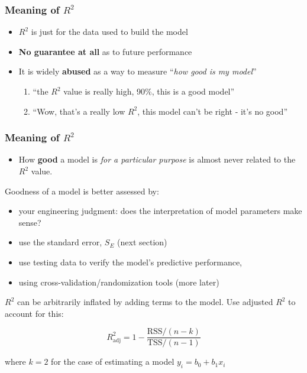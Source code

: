 \begin{frame}\frametitle{Meaning of $R^2$}
	\begin{itemize}
		\item	$R^2$ is just for the data used to build the model 
		\item	\textbf{No guarantee at all} as to future performance 
		\item	It is widely \textbf{abused} as a way to measure ``\emph{how good is my model}'' 
		\begin{enumerate}
			\item	``the $R^2$ value is really high, 90\%, this is a good model'' 
			\item	``Wow, that's a really low $R^2$, this model can't be right - it's no good'' 
		\end{enumerate}
	\end{itemize}
\end{frame}

\begin{frame}\frametitle{Meaning of $R^2$}
	\begin{itemize}
		\item	How \textbf{good} a model is \emph{for a particular purpose} is almost never related to the $R^2$ value. 
	\end{itemize}
	
	Goodness of a model is better assessed by:
	\begin{itemize}
		\item	your engineering judgment: does the interpretation of model parameters make sense? 
		\item	use the standard error, $S_E$ (next section) 
		\item	use testing data to verify the model's predictive performance, 
		\item	using cross-validation/randomization tools (more later) 
	\end{itemize}
	
	$R^2$ can be arbitrarily inflated by adding terms to the model. Use adjusted $R^2$ to account for this:
	
	$$ R^2_\text{adj} = 1 - \dfrac{\text{RSS}/(n-k)}{\text{TSS}/(n-1)} $$
	
	where $k=2$ for the case of estimating a model $y_i = b_0 + b_1 x_i$
\end{frame}

